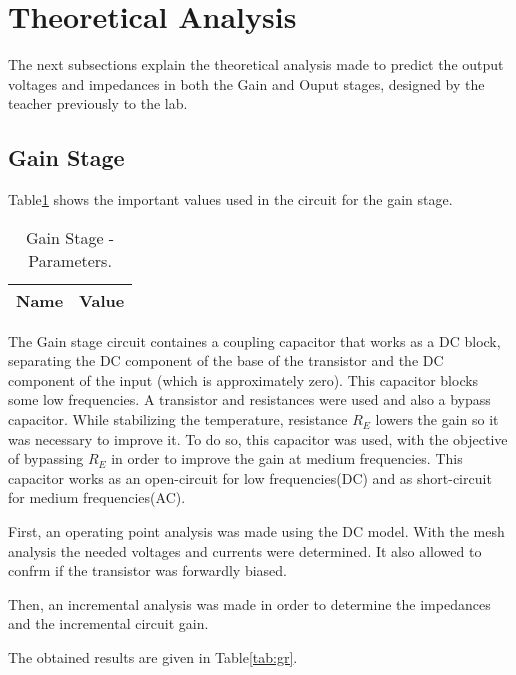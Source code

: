 \section{Theoretical Analysis}
\label{sec:analysis}
\par The next subsections explain the theoretical analysis made to predict the output voltages and impedances in both the Gain and Ouput stages, designed by the teacher previously to the lab.

\subsection{Gain Stage}

Table\ref{tab:dadosg} shows the important values used in the circuit for the gain stage.

\begin{table}[h]
  \centering
  \begin{tabular}{|l|r|}
    \hline    
    {\bf Name} & {\bf Value}\\ \hline
    
  \end{tabular}
  \caption{Gain Stage - Parameters.}
  \label{tab:dadosg}
\end{table}

\par The Gain stage circuit containes a coupling capacitor that works as a DC block, separating the DC component of the base of the transistor and the DC component of the input (which is approximately zero). This capacitor blocks some low frequencies. A transistor and resistances were used and also a bypass capacitor. While stabilizing the temperature, resistance $R_{E}$ lowers the gain so it was necessary to improve it. To do so, this capacitor was used, with the objective of bypassing $R_{E}$ in order to improve the gain at medium frequencies. This capacitor works as an open-circuit for low frequencies(DC) and as short-circuit for medium frequencies(AC).

\par First, an operating point analysis was made using the DC model. With the mesh analysis the needed voltages and currents were determined. It also allowed to confrm if the transistor was forwardly biased.

\par Then, an incremental analysis was made in order to determine the impedances and the incremental circuit gain.

\par The obtained results are given in Table\ref{tab:gr}.

